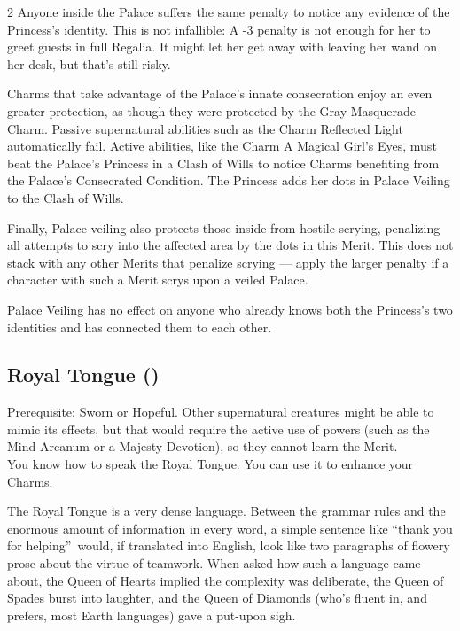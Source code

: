\begin{multicols}{2}
Anyone inside the Palace suffers the same penalty to notice any evidence of the Princess's identity. This is not infallible: A -3 penalty is not enough for her to greet guests in full Regalia. It might let her get away with leaving her wand on her desk, but that's still risky. 

Charms that take advantage of the Palace's innate consecration enjoy an even greater protection, as though they were protected by the Gray Masquerade Charm. Passive supernatural abilities such as the Charm Reflected Light automatically fail. Active abilities, like the Charm A Magical Girl's Eyes, must beat the Palace's Princess in a Clash of Wills to notice Charms benefiting from the Palace's Consecrated Condition. The Princess adds her dots in Palace Veiling to the Clash of Wills. 

Finally, Palace veiling also protects those inside from hostile scrying, penalizing all attempts to scry into the affected area by the dots in this Merit. This does not stack with any other Merits that penalize scrying — apply the larger penalty if a character with such a Merit scrys upon a veiled Palace.

Palace Veiling has no effect on anyone who already knows both the Princess's two identities and has connected them to each other.

\subsection*{Royal Tongue (\textbullet)}

Prerequisite: Sworn or Hopeful. Other supernatural creatures might be able to mimic its effects, but that would require the active use of powers (such as the Mind Arcanum or a Majesty Devotion), so they cannot learn the Merit.\\

\noindent You know how to speak the Royal Tongue. You can use it to enhance your Charms.

The Royal Tongue is a very dense language. Between the grammar rules and the enormous amount of information in every word, a simple sentence like \textquotedblleft thank you for helping\textquotedblright\, would, if translated into English, look like two paragraphs of flowery prose about the virtue of teamwork. When asked how such a language came about, the Queen of Hearts implied the complexity was deliberate, the Queen of Spades burst into laughter, and the Queen of Diamonds (who's fluent in, and prefers, most Earth languages) gave a put-upon sigh.


\end{multicols}
